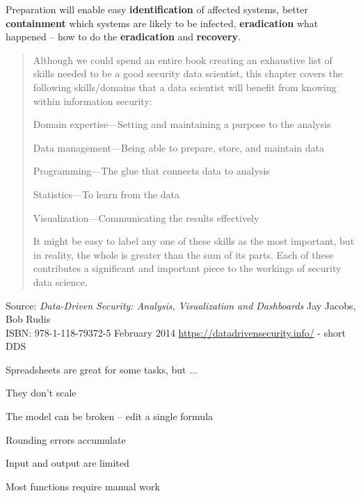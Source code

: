 \documentclass[Screen16to9,17pt]{foils}
\begin{document}
Preparation will enable easy {\bf identification} of affected systems, better {\bf containment} which systems are likely to be infected, {\bf eradication} what happened -- how to do the {\bf eradication} and {\bf recovery}.


\begin{quote}
Although we could spend an entire book creating an exhaustive list of skills needed to be a good security data scientist, this chapter covers the following skills/domains that a data scientist will benefit from
knowing within information security:
\begin{list2}
\item Domain expertise—Setting and maintaining a purpose to the analysis
\item Data management—Being able to prepare, store, and maintain data
\item Programming—The glue that connects data to analysis
\item Statistics—To learn from the data
\item Visualization—Communicating the results effectively
\end{list2}
It might be easy to label any one of these skills as the most important, but in reality, the whole is greater than the sum of its parts. Each of these contributes a significant and important piece to the workings of
security data science.
\end{quote}

Source: \emph{Data-Driven Security: Analysis, Visualization and Dashboards} Jay Jacobs, Bob Rudis\\
ISBN: 978-1-118-79372-5 February 2014 \url{https://datadrivensecurity.info/} - short DDS





\begin{quote}

\end{quote}

\begin{list2}
\item Spreadsheets are great for some tasks, but ...
\item They don't scale
\item The model can be broken -- edit a single formula
\item Rounding errors accumulate
\item Input and output are limited
\item Most functions require manual work
\end{list2}
\end{document}
